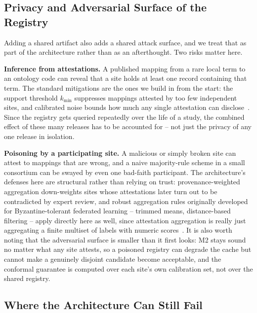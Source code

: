 \documentclass[conference]{IEEEtran}
\begin{document}
\subsection{Privacy and Adversarial Surface of the Registry}

Adding a shared artifact also adds a shared attack surface, and we treat that as part of the architecture rather than as an afterthought. Two risks matter here.

\textbf{Inference from attestations.} A published mapping from a rare local term to an ontology code can reveal that a site holds at least one record containing that term. The standard mitigations are the ones we build in from the start: the support threshold $k_{\min}$ suppresses mappings attested by too few independent sites, and calibrated noise bounds how much any single attestation can disclose~\cite{b24,b25}. Since the registry gets queried repeatedly over the life of a study, the combined effect of these many releases has to be accounted for -- not just the privacy of any one release in isolation.

\textbf{Poisoning by a participating site.} A malicious or simply broken site can attest to mappings that are wrong, and a naive majority-rule scheme in a small consortium can be swayed by even one bad-faith participant. The architecture's defenses here are structural rather than relying on trust: provenance-weighted aggregation down-weights sites whose attestations later turn out to be contradicted by expert review, and robust aggregation rules originally developed for Byzantine-tolerant federated learning -- trimmed means, distance-based filtering -- apply directly here as well, since attestation aggregation is really just aggregating a finite multiset of labels with numeric scores~\cite{b51}. It is also worth noting that the adversarial surface is smaller than it first looks: M2 stays sound no matter what any site attests, so a poisoned registry can degrade the cache but cannot make a genuinely disjoint candidate become acceptable, and the conformal guarantee is computed over each site's own calibration set, not over the shared registry.

\subsection{Where the Architecture Can Still Fail}
\end{document}
